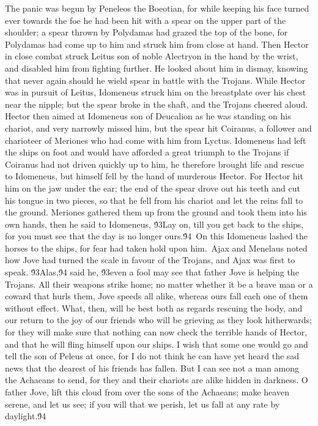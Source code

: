 {The panic was begun by Peneleos the Boeotian, for while keeping his face turned ever towards the foe he had been hit with a spear on the upper part of the shoulder; a spear thrown by Polydamas had grazed the top of the bone, for Polydamas had come up to him and struck him from close at hand. Then Hector in close combat struck Leitus son of noble Alectryon in the hand by the wrist, and disabled him from fighting further. He looked about him in dismay, knowing that never again should he wield spear in battle with the Trojans. While Hector was in pursuit of Leitus, Idomeneus struck him on the breastplate over his chest near the nipple; but the spear broke in the shaft, and the Trojans cheered aloud. Hector then aimed at Idomeneus son of Deucalion as he was standing on his chariot, and very narrowly missed him, but the spear hit Coiranus, a follower and charioteer of Meriones who had come with him from Lyctus. Idomeneus had left the ships on foot and would have afforded a great triumph to the Trojans if Coiranus had not driven quickly up to him, he therefore brought life and rescue to Idomeneus, but himself fell by the hand of murderous Hector. For Hector hit him on the jaw under the ear; the end of the spear drove out his teeth and cut his tongue in two pieces, so that he fell from his chariot and let the reins fall to the ground. Meriones gathered them up from the ground and took them into his own hands, then he said to Idomeneus, \'93Lay on, till you get back to the ships, for you must see that the day is no longer ours.\'94\
On this Idomeneus lashed the horses to the ships, for fear had taken hold upon him.\
Ajax and Menelaus noted how Jove had turned the scale in favour of the Trojans, and Ajax was first to speak. \'93Alas,\'94 said he, \'93even a fool may see that father Jove is helping the Trojans. All their weapons strike home; no matter whether it be a brave man or a coward that hurls them, Jove speeds all alike, whereas ours fall each one of them without effect. What, then, will be best both as regards rescuing the body, and our return to the joy of our friends who will be grieving as they look hitherwards; for they will make sure that nothing can now check the terrible hands of Hector, and that he will fling himself upon our ships. I wish that some one would go and tell the son of Peleus at once, for I do not think he can have yet heard the sad news that the dearest of his friends has fallen. But I can see not a man among the Achaeans to send, for they and their chariots are alike hidden in darkness. O father Jove, lift this cloud from over the sons of the Achaeans; make heaven serene, and let us see; if you will that we perish, let us fall at any rate by daylight.\'94\
}
